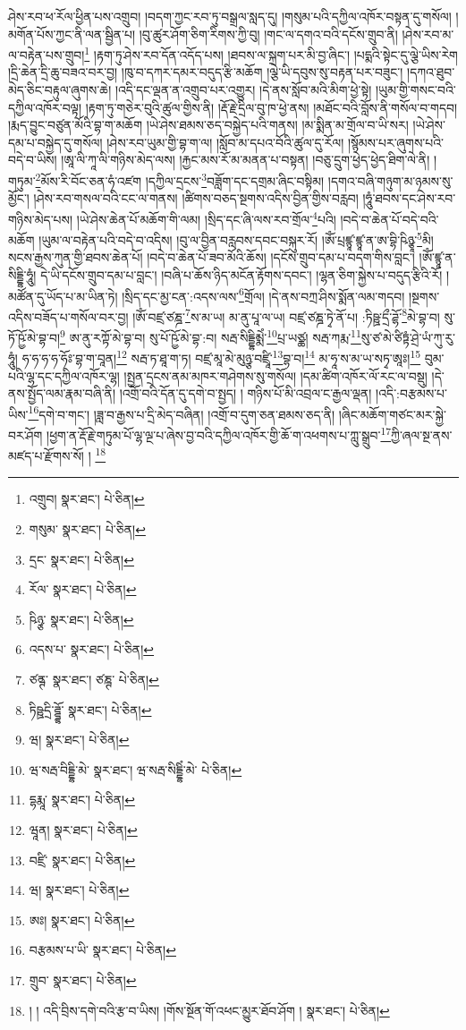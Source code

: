 ཤེས་རབ་ཕ་རོལ་ཕྱིན་པས་འགྲུབ། །བདག་ཀྱང་རབ་ཏུ་བསྒྲལ་སླད་དུ། །གསུམ་པའི་དཀྱིལ་འཁོར་བསྟན་དུ་གསོལ། །མགོན་པོས་ཀྱང་ནི་ལན་སྦྱིན་པ། །བུ་ཚུར་ཤོག་ཅིག་རིགས་ཀྱི་བུ། །གང་ལ་དགའ་བའི་དངོས་གྲུབ་ནི། །ཤེས་རབ་མ་ལ་བརྟེན་པས་གྲུབ།\footnote{འགྲུབ།  སྣར་ཐང་།  པེ་ཅིན། } །རྟག་ཏུ་ཤེས་རབ་དོན་འདོད་པས། །ཐབས་ལ་སྐྲག་པར་མི་བྱ་ཞིང་། །པདྨའི་སྟེང་དུ་ལྕེ་ཡིས་རེག །དྲི་ཆེན་དྲི་ཆུ་བཟའ་བར་བྱ། །ཁུ་བ་དཀར་དམར་བདུད་རྩི་མཆོག །ལྕེ་ཡི་དབུས་སུ་བརྟན་པར་བཟུང་། །དཀའ་ཐུབ་མེད་ཅིང་བརྟུལ་ཞུགས་ཆེ། །འདི་དང་ལྡན་ན་འགྲུབ་པར་འགྱུར། །དེ་ནས་སློབ་མའི་མིག་ཕྱེ་སྟེ། །ཡུམ་གྱི་གསང་བའི་དཀྱིལ་འཁོར་བལྟ། །རྟག་ཏུ་གཅེར་བུའི་ཚུལ་གྱིས་ནི། །རྡོ་རྗེ་དྲིལ་བུ་ཁ་ཕྱེ་ནས། །མཐོང་བའི་བློས་ནི་གསོལ་བ་གདབ། །རྨད་བྱུང་བཙུན་མོའི་བྷ་ག་མཆོག །ཡེ་ཤེས་ཐམས་ཅད་བསྐྱེད་པའི་གནས། །མ་སྨིན་མ་གྲོལ་བ་ཡི་སར། །ཡེ་ཤེས་དམ་པ་བསྐྱེད་དུ་གསོལ། །ཤེས་རབ་ཡུམ་གྱི་བྷ་ག་ལ། །སློབ་མ་དཔའ་བོའི་ཚུལ་དུ་རོལ། །སྙོམས་པར་ཞུགས་པའི་བདེ་བ་ཡིས། །ཨཱ་ལི་ཀཱ་ལི་གཉིས་མེད་ལས། །རྐྱང་མས་རོ་མ་མནན་པ་བསྟན། །བཅུ་དྲུག་ཕྱེད་ཕྱེད་ཐིག་ལེ་ནི། །གཏུམ་\footnote{གསུམ་  སྣར་ཐང་།  པེ་ཅིན། }མོས་རི་བོང་ཅན་ཧཾ་འཛག །དཀྱིལ་དྲངས་\footnote{དྲང་  སྣར་ཐང་།  པེ་ཅིན། }བཟློག་དང་དགྲམ་ཞིང་བསྟིམ། །དགའ་བཞི་གཉུག་མ་ཉམས་སུ་མྱོང་། །ཤེས་རབ་གསལ་བའི་ངང་ལ་གནས། །ཚིགས་བཅད་སྔགས་འདིས་བྱིན་གྱིས་བརླབ། །ཧཱུཾ་ཐབས་དང་ཤེས་རབ་གཉིས་མེད་པས། །ཡེ་ཤེས་ཆེན་པོ་མཆོག་གི་ལམ། །སྲིད་དང་ཞི་ལས་རབ་གྲོལ་\footnote{རོལ་  སྣར་ཐང་།  པེ་ཅིན། }པའི། །བདེ་བ་ཆེན་པོ་བདེ་བའི་མཆོག །ཡུམ་ལ་བརྟེན་པའི་བདེ་བ་འདིས། །བུ་ལ་བྱིན་བརླབས་དབང་བསྐུར་རོ། །ཨོཾ་པྲཛྙཱ་ཛྙཱ་ན་ཨ་བྷི་ཥིཉྩཱ་\footnote{ཥིཉྩ་  སྣར་ཐང་།  པེ་ཅིན། }མི། སངས་རྒྱས་ཀུན་གྱི་ཐབས་ཆེན་པོ། །བདེ་བ་ཆེན་པོ་ཟབ་མོའི་ཆོས། །དངོས་གྲུབ་དམ་པ་བདག་གིས་བླང་། །ཨོཾ་ཛྙཱ་ན་སིདྡྷི་ཧཱུཾ། དེ་ཡི་དངོས་གྲུབ་དམ་པ་བླང་། །བཞི་པ་ཆོས་ཉིད་མངོན་རྟོགས་དབང་། །ལྷན་ཅིག་སྐྱེས་པ་བདུད་རྩིའི་རོ། །མཚོན་དུ་ཡོད་པ་མ་ཡིན་ཏེ། །སྲིད་དང་མྱ་ངན་:འདས་ལས་\footnote{འདས་པ་  སྣར་ཐང་།  པེ་ཅིན། }གྲོལ། །དེ་ནས་བཀྲ་ཤིས་སྨོན་ལམ་གདབ། །སྔགས་འདིས་བཟོད་པ་གསོལ་བར་བྱ། །ཨོཾ་བཛྲ་ཙཎྜ་\footnote{ཙནྚ་  སྣར་ཐང་། ཙཎྚ་  པེ་ཅིན། }ས་མ་ཡ། མ་ནུ་པཱ་ལ་ཡ། བཛྲ་ཙཎྜ་ཏྭེ་ནོ་པ། :ཏིཥྛ་དྲྀ་ཌྷོ་\footnote{ཏིཥྛདྲི་ཌྜྷོ་  སྣར་ཐང་།  པེ་ཅིན། }མེ་བྷ་བ། སུ་ཏོ་ཥྱོ་མེ་བྷ་བ།\footnote{ཝ།  སྣར་ཐང་།  པེ་ཅིན། } ཨ་ནུ་རཀྟོ་མེ་བྷ་བ། སུ་པོ་ཥྱོ་མེ་བྷ་:བ། སརྦ་སིདྡྷིམྨེཾ་\footnote{ཝ་སརྦ་བིདྡྷི་མེ་  སྣར་ཐང་། ཝ་སརྦ་སིདྡྷིཾ་མེ་  པེ་ཅིན། }པྲ་ཡཙྪ། སརྦ་ཀརྨ་\footnote{དྷརྨཱ་  སྣར་ཐང་།  པེ་ཅིན། }སུ་ཙ་མེ་ཙིཏྟཾ་ཤྲེ་ཡཾ་ཀུ་རུ་ཧཱུཾ། ཧ་ཧ་ཧ་ཧ་ཧོཿ་བྷ་ག་བཱན།\footnote{ཝཱན།  སྣར་ཐང་།  པེ་ཅིན། } སརྦ་ཏ་ཐཱ་ག་ཏ། བཛྲ་མཱ་མེ་མུཉྩ་བཛྲཱི་\footnote{བཛྲི་  སྣར་ཐང་།  པེ་ཅིན། }བྷ་བ།\footnote{ཝ།  སྣར་ཐང་།  པེ་ཅིན། } མ་ཧཱ་ས་མ་ཡ་སཏྭ་ཨཱཿ།\footnote{ཨཿ།  སྣར་ཐང་།  པེ་ཅིན། } བུམ་པའི་ལྷ་དང་དཀྱིལ་འཁོར་ལྷ། །སྤྱན་དྲངས་ནམ་མཁར་གཤེགས་སུ་གསོལ། །དམ་ཚིག་འཁོར་ལོ་རང་ལ་བསྡུ། །དེ་ནས་སྤྱོད་ལམ་རྣམ་བཞི་ནི། །འགྲོ་བའི་དོན་དུ་དགེ་བ་སྤྱད། །
གཉིས་པོ་མི་འབྲལ་ང་རྒྱལ་ལྡན། །འདི་:བརྩམས་པ་ཡིས་\footnote{བརྩམས་པ་ཡི་  སྣར་ཐང་།  པེ་ཅིན། }དགེ་བ་གང་། །ཟླ་བ་རྒྱས་པ་དྲི་མེད་བཞིན། །འགྲོ་བ་དུག་ཅན་ཐམས་ཅད་ནི། །ཞིང་མཆོག་གཙང་མར་སྐྱེ་བར་ཤོག །ཕྱག་ན་རྡོ་རྗེ་གཏུམ་པོ་ལྷ་ལྔ་པ་ཞེས་བྱ་བའི་དཀྱིལ་འཁོར་གྱི་ཆོ་ག་འཕགས་པ་ཀླུ་སྒྲུབ་\footnote{གྲུབ་  སྣར་ཐང་།  པེ་ཅིན། }ཀྱི་ཞལ་སྔ་ནས་མཛད་པ་རྫོགས་སོ། ། \footnote{། ། འདི་བྲིས་དགེ་བའི་རྩ་བ་ཡིས། །གོས་སྔོན་གོ་འཕང་མྱུར་ཐོབ་ཤོག །  སྣར་ཐང་།  པེ་ཅིན། }